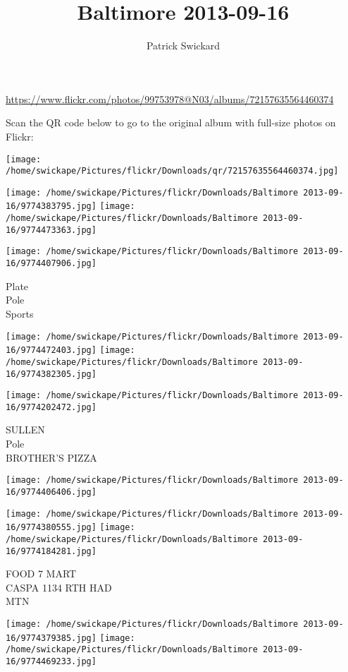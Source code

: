 \documentclass[10pt,letterpaper]{article}
\title{Baltimore 2013-09-16}
\author{Patrick Swickard}
\date{}
\begin{document}
\maketitle

\url{https://www.flickr.com/photos/99753978@N03/albums/72157635564460374}

Scan the QR code below to go to the original album with full-size photos on Flickr:

\texttt{[image: /home/swickape/Pictures/flickr/Downloads/qr/72157635564460374.jpg]}
\pagebreak

\texttt{[image: /home/swickape/Pictures/flickr/Downloads/Baltimore 2013-09-16/9774383795.jpg]}
\texttt{[image: /home/swickape/Pictures/flickr/Downloads/Baltimore 2013-09-16/9774473363.jpg]}

\vspace{0.25in}
\texttt{[image: /home/swickape/Pictures/flickr/Downloads/Baltimore 2013-09-16/9774407906.jpg]}

Plate\\
Pole\\
Sports
\pagebreak

\texttt{[image: /home/swickape/Pictures/flickr/Downloads/Baltimore 2013-09-16/9774472403.jpg]}
\texttt{[image: /home/swickape/Pictures/flickr/Downloads/Baltimore 2013-09-16/9774382305.jpg]}

\texttt{[image: /home/swickape/Pictures/flickr/Downloads/Baltimore 2013-09-16/9774202472.jpg]}

SULLEN\\
Pole\\
BROTHER'S PIZZA
\pagebreak

\texttt{[image: /home/swickape/Pictures/flickr/Downloads/Baltimore 2013-09-16/9774406406.jpg]}

\vspace{0.25in}
\texttt{[image: /home/swickape/Pictures/flickr/Downloads/Baltimore 2013-09-16/9774380555.jpg]}
\texttt{[image: /home/swickape/Pictures/flickr/Downloads/Baltimore 2013-09-16/9774184281.jpg]}

FOOD 7 MART\\
CASPA 1134 RTH HAD\\
MTN
\pagebreak

\texttt{[image: /home/swickape/Pictures/flickr/Downloads/Baltimore 2013-09-16/9774379385.jpg]}
\texttt{[image: /home/swickape/Pictures/flickr/Downloads/Baltimore 2013-09-16/9774469233.jpg]}
\end{document}
